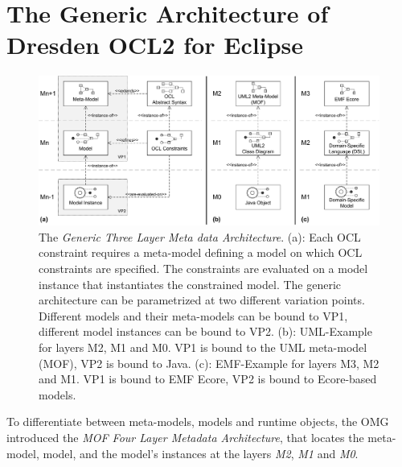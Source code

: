 \section{The Generic Architecture of Dresden OCL2 for Eclipse}
	
	\begin{figure}[tb]
			\centering
				\includegraphics[width=1.00\textwidth]{figures/genericlayers.pdf}
			\caption{ The \textit{Generic Three Layer Meta data Architecture}. (a): Each OCL constraint 
			requires a meta-model defining a model on which OCL constraints are specified. The 
			constraints are evaluated on a model instance that instantiates the constrained model. 
			The generic architecture can be parametrized at two different variation points. Different
			models and their meta-models can be bound to VP1, different model instances can be bound
			to VP2.	(b): UML-Example for layers M2, M1 and M0. VP1 is bound to the UML meta-model (MOF), 
			VP2 is bound to Java. (c): EMF-Example for layers M3, M2 and M1. VP1 is bound to EMF Ecore,
			VP2 is bound to Ecore-based models.}
			\label{fig:genericlayers}
		\end{figure}

	To differentiate between meta-models, models and runtime objects, the OMG introduced 
	the \textit{MOF Four Layer Metadata Architecture}, that locates the meta-model, 
	model, and the model's instances at the layers \textit{M2}, \textit{M1} and \textit{M0}. 
	
